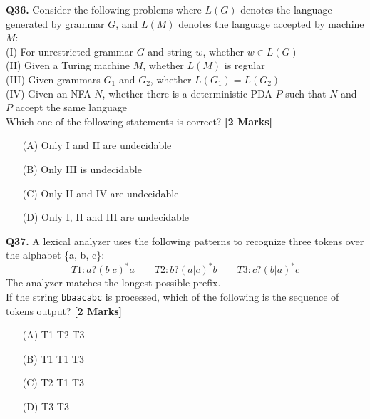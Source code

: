 \documentclass[11pt]{article}
\newcommand{\questionb}[2]{
    \noindent\textbf{Q#2.} #1 \hfill \textbf{[2 Marks]}
}
\begin{document}
\questionb{Consider the following problems where \( L(G) \) denotes the language generated by grammar \( G \), and \( L(M) \) denotes the language accepted by machine \( M \):\\
(I) For unrestricted grammar \( G \) and string \( w \), whether \( w \in L(G) \)\\
(II) Given a Turing machine \( M \), whether \( L(M) \) is regular\\
(III) Given grammars \( G_1 \) and \( G_2 \), whether \( L(G_1) = L(G_2) \)\\
(IV) Given an NFA \( N \), whether there is a deterministic PDA \( P \) such that \( N \) and \( P \) accept the same language\\
Which one of the following statements is correct?}{36}
\begin{enumerate}
    \item[(A)] Only I and II are undecidable
    \item[(B)] Only III is undecidable
    \item[(C)] Only II and IV are undecidable
    \item[(D)] Only I, II and III are undecidable
\end{enumerate}
\vspace{0.5cm}

\questionb{A lexical analyzer uses the following patterns to recognize three tokens over the alphabet \{a, b, c\}:\\
\[
T1: a? (b|c)^* a \qquad
T2: b? (a|c)^* b \qquad
T3: c? (b|a)^* c
\]
The analyzer matches the longest possible prefix.\\
If the string \texttt{bbaacabc} is processed, which of the following is the sequence of tokens output?}{37}
\begin{enumerate}
    \item[(A)] T1 T2 T3
    \item[(B)] T1 T1 T3
    \item[(C)] T2 T1 T3
    \item[(D)] T3 T3
\end{enumerate}
\vspace{0.5cm}
\end{document}
